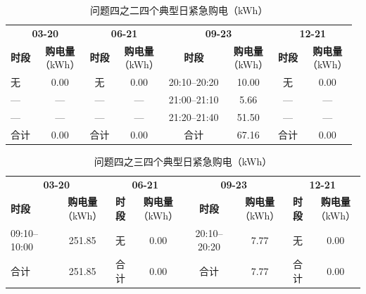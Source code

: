 \documentclass[UTF8,a4paper,zihao=-4,fontset=windows]{ctexart}
\begin{document}
\begin{table}[H]\centering
\fontsize{9.5}{12}\selectfont\setlength{\tabcolsep}{4pt}\renewcommand{\arraystretch}{1.12}
\begin{adjustbox}{max width=\linewidth}\begin{tabular}{lccccccc}\toprule
\multicolumn{2}{c}{\textbf{03-20}} & \multicolumn{2}{c}{\textbf{06-21}} & \multicolumn{2}{c}{\textbf{09-23}} & \multicolumn{2}{c}{\textbf{12-21}}\\
\cmidrule(lr){1-2} \cmidrule(lr){3-4} \cmidrule(lr){5-6} \cmidrule(lr){7-8}
\textbf{时段} & \shortstack{\textbf{购电量}\\{\normalfont （kWh）}} & \textbf{时段} & \shortstack{\textbf{购电量}\\{\normalfont （kWh）}} & \textbf{时段} & \shortstack{\textbf{购电量}\\{\normalfont （kWh）}} & \textbf{时段} & \shortstack{\textbf{购电量}\\{\normalfont （kWh）}}\\\midrule
无 & 0.00 & 无 & 0.00 & 20:10–20:20 & 10.00 & 无 & 0.00\\
— & — & — & — & 21:00–21:10 & 5.66 & — & —\\
— & — & — & — & 21:20–21:40 & 51.50 & — & —\\
合计 & 0.00 & 合计 & 0.00 & 合计 & 67.16 & 合计 & 0.00\\
\bottomrule\end{tabular}\end{adjustbox}
\caption{问题四之二四个典型日紧急购电（kWh）}
\end{table}
\begin{table}[H]\centering
\fontsize{9.5}{12}\selectfont\setlength{\tabcolsep}{4pt}\renewcommand{\arraystretch}{1.12}
\begin{adjustbox}{max width=\linewidth}\begin{tabular}{lccccccc}\toprule
\multicolumn{2}{c}{\textbf{03-20}} & \multicolumn{2}{c}{\textbf{06-21}} & \multicolumn{2}{c}{\textbf{09-23}} & \multicolumn{2}{c}{\textbf{12-21}}\\
\cmidrule(lr){1-2} \cmidrule(lr){3-4} \cmidrule(lr){5-6} \cmidrule(lr){7-8}
\textbf{时段} & \shortstack{\textbf{购电量}\\{\normalfont （kWh）}} & \textbf{时段} & \shortstack{\textbf{购电量}\\{\normalfont （kWh）}} & \textbf{时段} & \shortstack{\textbf{购电量}\\{\normalfont （kWh）}} & \textbf{时段} & \shortstack{\textbf{购电量}\\{\normalfont （kWh）}}\\\midrule
09:10–10:00 & 251.85 & 无 & 0.00 & 20:10–20:20 & 7.77 & 无 & 0.00\\
合计 & 251.85 & 合计 & 0.00 & 合计 & 7.77 & 合计 & 0.00\\
\bottomrule\end{tabular}\end{adjustbox}
\caption{问题四之三四个典型日紧急购电（kWh）}
\end{table}
\end{document}
